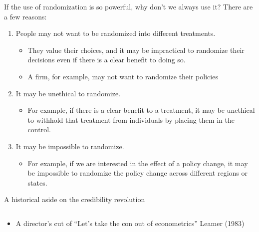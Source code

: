\documentclass[notes,11pt, aspectratio=169]{beamer}
\begin{document}
\begin{frame}{If the use of randomization is so powerful, why don't we always use it?}
  There are a few reasons:
  \begin{enumerate}
    \item People may not want to be randomized into different treatments. 
    \begin{itemize}
      \item They value their choices, and it may be impractical to randomize their decisions even if there is a clear benefit to doing so. 
      \item A firm, for example, may not want to randomize their policies
    \end{itemize}
    \item It may be unethical to randomize.
    \begin{itemize}
      \item For example, if there is a clear benefit to a treatment, it may be unethical to withhold that treatment from individuals by placing them in the control.
    \end{itemize}
    \item It may be impossible to randomize. 
    \begin{itemize}
      \item For example, if we are interested in the effect of a policy change, it may be impossible to randomize the policy change across different regions or states.
    \end{itemize}
  \end{enumerate}
\end{frame}

\begin{frame}{A historical aside on the credibility revolution}
\begin{columns}[T] %
  \begin{column}{.4\textwidth}
    \begin{itemize}
    \item A director's cut of ``Let's take the con out of econometrics'' Leamer (1983)
    \end{itemize}
\end{column}%
\hfill%
\begin{column}{.6\textwidth}
  \vspace{-8pt}
  \begin{center}
  \end{center}
\end{column}%
\end{columns}
\end{frame}
\end{document}
